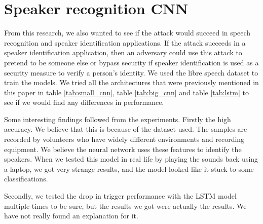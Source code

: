 \documentclass{report}
\theoremstyle{definition}
\theoremstyle{remark}
\begin{document}
\section{Speaker recognition CNN}
From this research, we also wanted to see if the attack would succeed in speech recognition and speaker identification applications. If the attack succeeds in a speaker identification application, then an adversary could use this attack to pretend to be someone else or bypass security if speaker identification is used as a security measure to verify a person's identity. We  used the libre speech dataset \cite{7178964} to train the models. We tried all the architectures that were previously mentioned in this paper in table \ref{tab:small_cnn}, table \ref{tab:big_cnn} and table \ref{tab:lstm} to see if we would find any differences in performance.  

Some interesting findings followed from the experiments. Firstly the high accuracy. We believe that this is because of the dataset used. The samples are recorded by volunteers who have widely different environments and recording equipment. We believe the neural network uses these features to identify the speakers. When we tested this model in real life by playing the sounds back using a laptop, we got very strange results, and the model looked like it stuck to some classifications.

Secondly, we tested the drop in trigger performance with the LSTM model multiple times to be sure, but the results we got were actually the results. We have not really found an explanation for it.
\end{document}
